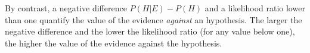 \documentclass[10pt]{article}
\begin{document}

 By contrast, a negative difference $P(H | E) - P(H)$ and a likelihood ratio lower than one  
quantify the value of the evidence \textit{against} an hypothesis.
The larger the negative difference and the lower the likelihood ratio (for any value below one), 
the higher the value of the evidence against the hypothesis.

\end{document}
